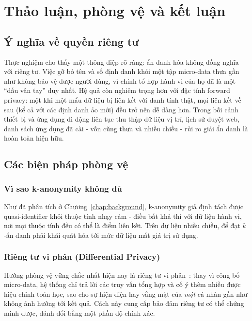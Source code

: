 \chapter{Thảo luận, phòng vệ và kết luận}
\label{chap:conclusion}

\section{Ý nghĩa về quyền riêng tư}

Thực nghiệm cho thấy một thông điệp rõ ràng: ẩn danh hóa không đồng nghĩa với riêng tư. Việc gỡ bỏ tên và số định danh khỏi một tập micro-data thưa gần như không bảo vệ được người dùng, vì chính tổ hợp hành vi của họ đã là một ``dấu vân tay'' duy nhất. Hệ quả còn nghiêm trọng hơn với đặc tính forward privacy: một khi một mẩu dữ liệu bị liên kết với danh tính thật, mọi liên kết về sau (kể cả với các định danh ảo mới) đều trở nên dễ dàng hơn. Trong bối cảnh thiết bị và ứng dụng di động liên tục thu thập dữ liệu vị trí, lịch sử duyệt web, danh sách ứng dụng đã cài - vốn cũng thưa và nhiều chiều - rủi ro giải ẩn danh là hoàn toàn hiện hữu.

\section{Các biện pháp phòng vệ}

\subsection{Vì sao k-anonymity không đủ}
Như đã phân tích ở Chương~\ref{chap:background}, k-anonymity giả định tách được quasi-identifier khỏi thuộc tính nhạy cảm - điều bất khả thi với dữ liệu hành vi, nơi mọi thuộc tính đều có thể là điểm liên kết. Trên dữ liệu nhiều chiều, để đạt $k$-ẩn danh phải khái quát hóa tới mức dữ liệu mất giá trị sử dụng.

\subsection{Riêng tư vi phân (Differential Privacy)}
Hướng phòng vệ vững chắc nhất hiện nay là riêng tư vi phân~\cite{dwork}: thay vì công bố micro-data, hệ thống chỉ trả lời các truy vấn tổng hợp và cố ý thêm nhiễu được hiệu chỉnh toán học, sao cho sự hiện diện hay vắng mặt của \textit{một} cá nhân gần như không ảnh hưởng tới kết quả. Cách này cung cấp bảo đảm riêng tư có thể chứng minh được, đánh đổi bằng một phần độ chính xác.

